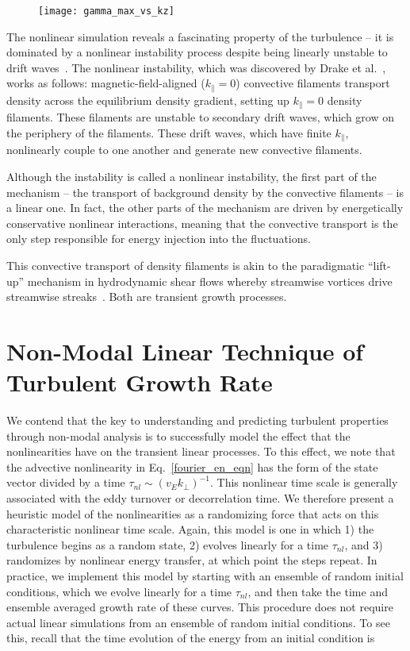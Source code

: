 \documentclass[letter,scriptaddress,twocolumn, prl,showkeys]{revtex4}
\def\para{\parallel}
\begin{document}
\begin{figure}
\centerline{\texttt{[image: gamma\_max\_vs\_kz]}}
\caption{}
\label{gamma_max_vs_kz}
\end{figure}

The nonlinear simulation reveals a fascinating property of the turbulence -- 
it is dominated by a nonlinear instability process despite being linearly unstable to drift waves~\cite{friedman2012b,friedman2013}.
The nonlinear instability, which was discovered by Drake et al.~\cite{drake1995}, works as follows: 
magnetic-field-aligned ($k_\para=0$) convective filaments transport density across the equilibrium density gradient, setting up $k_\para=0$ density filaments. 
These filaments are unstable to secondary drift waves, which grow on the periphery of the filaments. 
These drift waves, which have finite $k_\para$, nonlinearly couple to one another and generate new convective filaments.

Although the instability is called a nonlinear instability, the first part of the mechanism -- the transport of background density by the convective filaments -- is a linear one.
In fact, the other parts of the mechanism are driven by energetically conservative nonlinear interactions, 
meaning that the convective transport is the only step responsible for energy injection into the fluctuations.


This convective transport of density filaments is akin to the paradigmatic ``lift-up'' mechanism in hydrodynamic shear flows whereby streamwise vortices drive streamwise 
streaks~\cite{trefethen1993,krommes1999}.
Both are transient growth processes.

\section{Non-Modal Linear Technique of Turbulent Growth Rate}



We contend that the key to understanding and predicting turbulent properties through non-modal analysis is 
to successfully model the effect that the nonlinearities have on the transient linear processes. 
To this effect, we note that the advective nonlinearity in Eq.~\ref{fourier_en_eqn} has the form of the state vector divided by a time $\tau_{nl} \sim (v_E k_\perp)^{-1}$. This nonlinear
time scale is generally associated with the eddy turnover or decorrelation time. We therefore present a heuristic model of the nonlinearities 
as a randomizing force that acts on this characteristic nonlinear time scale. Again, this model is one in which 1) the turbulence begins as a random state, 
2) evolves linearly for a time $\tau_{nl}$, and 3) randomizes by nonlinear energy transfer, at which point the steps repeat.
In practice, we implement this model by starting with an ensemble of random initial conditions, which we evolve linearly for a time $\tau_{nl}$, 
and then take the time and ensemble averaged growth rate of these curves.
This procedure does not require actual linear simulations from an ensemble of random initial conditions. To see this, recall that the time evolution of the energy from an initial condition is
\end{document}
